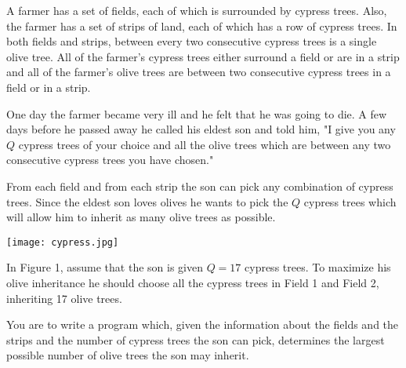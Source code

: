 A farmer has a set of fields, each of which is surrounded by cypress trees.
Also, the farmer has a set of strips of land, each of which has a row of cypress trees.
In both fields and strips, between every two consecutive cypress trees is a single olive tree.
All of the farmer's cypress trees either surround a field or are in a strip and all of the farmer's olive trees are between two consecutive cypress trees in a field or in a strip.

One day the farmer became very ill and he felt that he was going to die.
A few days before he passed away he called his eldest son and told him, "I give you any $Q$ cypress trees of your choice and all the olive trees which are between any two consecutive cypress trees you have chosen."

From each field and from each strip the son can pick any combination of cypress trees.
Since the eldest son loves olives he wants to pick the $Q$ cypress trees which will allow him to inherit as many olive trees as possible.

\texttt{[image: cypress.jpg]}

In Figure 1, assume that the son is given $Q=17$ cypress trees.
To maximize his olive inheritance he should choose all the cypress trees in Field 1 and Field 2, inheriting 17 olive trees.

You are to write a program which, given the information about the fields and the strips and the number of cypress trees the son can pick, determines the largest possible number of olive trees the son may inherit.  